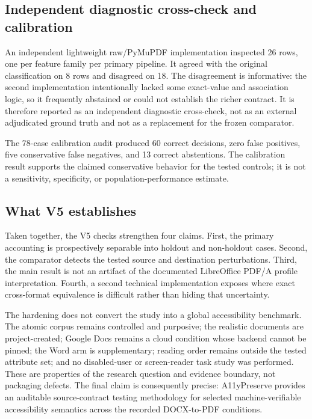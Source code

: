 \subsection{Independent diagnostic cross-check and calibration}
\label{sec:v5-validation}

An independent lightweight raw/PyMuPDF implementation inspected 26 rows, one per feature family per primary pipeline. It agreed with the original classification on 8 rows and disagreed on 18. The disagreement is informative: the second implementation intentionally lacked some exact-value and association logic, so it frequently abstained or could not establish the richer contract. It is therefore reported as an independent diagnostic cross-check, not as an external adjudicated ground truth and not as a replacement for the frozen comparator.

The 78-case calibration audit produced 60 correct decisions, zero false positives, five conservative false negatives, and 13 correct abstentions. The calibration result supports the claimed conservative behavior for the tested controls; it is not a sensitivity, specificity, or population-performance estimate.

\subsection{What V5 establishes}
\label{sec:v5-interpretation}

Taken together, the V5 checks strengthen four claims. First, the primary accounting is prospectively separable into holdout and non-holdout cases. Second, the comparator detects the tested source and destination perturbations. Third, the main result is not an artifact of the documented LibreOffice PDF/A profile interpretation. Fourth, a second technical implementation exposes where exact cross-format equivalence is difficult rather than hiding that uncertainty.

The hardening does not convert the study into a global accessibility benchmark. The atomic corpus remains controlled and purposive; the realistic documents are project-created; Google Docs remains a cloud condition whose backend cannot be pinned; the Word arm is supplementary; reading order remains outside the tested attribute set; and no disabled-user or screen-reader task study was performed. These are properties of the research question and evidence boundary, not packaging defects. The final claim is consequently precise: A11yPreserve provides an auditable source-contract testing methodology for selected machine-verifiable accessibility semantics across the recorded DOCX-to-PDF conditions.
